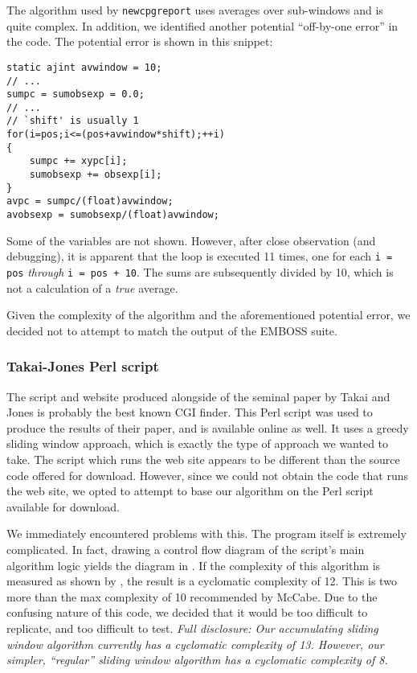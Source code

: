 \documentclass{bioinfo}
\begin{document}
The algorithm used by \texttt{newcpgreport} uses averages over
sub-windows and is quite complex. In addition, we identified another
potential ``off-by-one error'' in the code. The potential error is
shown in this snippet:

\begin{verbatim}
static ajint avwindow = 10;
// ...
sumpc = sumobsexp = 0.0;
// ...
// `shift' is usually 1
for(i=pos;i<=(pos+avwindow*shift);++i)
{
    sumpc += xypc[i];
    sumobsexp += obsexp[i];
}
avpc = sumpc/(float)avwindow;
avobsexp = sumobsexp/(float)avwindow;
\end{verbatim}

Some of the variables are not shown. However, after close observation
(and debugging), it is apparent that the loop is executed 11 times,
one for each \verb|i = pos| \emph{through} \verb|i = pos + 10|. The
sums are subsequently divided by 10, which is not a calculation of a
\emph{true} average.

Given the complexity of the algorithm and the aforementioned potential
error, we decided not to attempt to match the output of the EMBOSS
suite.

\subsubsection{Takai-Jones Perl script}

The script and website produced alongside of the seminal paper by
Takai and Jones is probably the best known CGI finder. This Perl script was
used to produce the results of their paper, and is available online as
well. It uses a greedy sliding
window approach, which is exactly the type of approach we wanted to
take. The script which runs the web site appears to be different than
the source code offered for download. However, since we could not obtain
the code that runs the web site, we opted to attempt to base our
algorithm on the Perl script available for download.

We immediately encountered problems with this. The program itself is
extremely complicated. In fact, drawing a control flow diagram of the
script's main algorithm logic yields the diagram in
. If the complexity of this algorithm is
measured as shown by \cite{McCabe:1976:CM:1313324.1313586}, the result
is a cyclomatic complexity of 12. This is two more than the max
complexity of 10 recommended by McCabe. Due to the confusing nature of
this code, we decided that it would be too difficult to replicate, and
too difficult to test. \textit{Full disclosure: Our accumulating
  sliding window algorithm currently has a cyclomatic complexity of
  13. However, our simpler, ``regular'' sliding window algorithm has a
  cyclomatic complexity of 8.}
\end{document}
